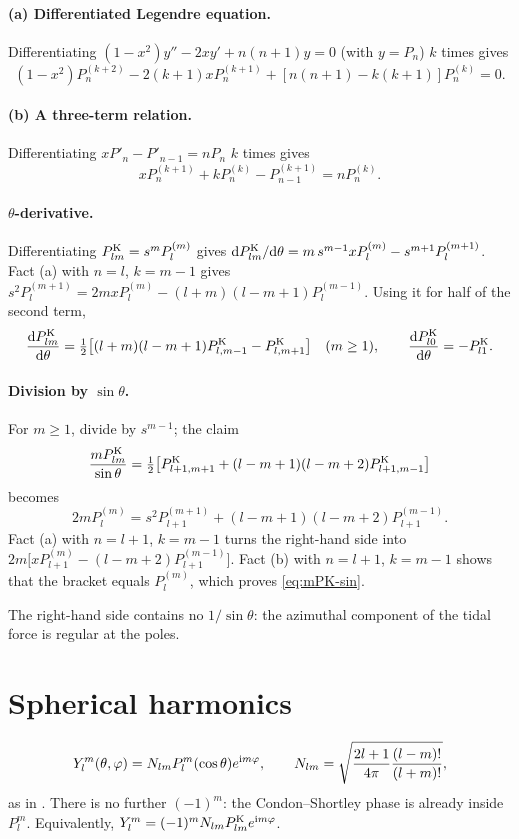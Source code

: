 \paragraph{(a) Differentiated Legendre equation.} Differentiating $(1-x^2)y''-2xy'+n(n+1)y=0$ (with $y=P_n$) $k$ times gives
\[
  (1-x^2)P^{(k+2)}_n-2(k+1)xP^{(k+1)}_n+[n(n+1)-k(k+1)]P^{(k)}_n=0.
\]

\paragraph{(b) A three-term relation.} Differentiating $xP'_n-P'_{n-1}=nP_n$ $k$ times gives
\[
  xP^{(k+1)}_n+kP^{(k)}_n-P^{(k+1)}_{n-1}=nP^{(k)}_n.
\]

\paragraph{$\theta$-derivative.} Differentiating $P^{\mathrm K}_{lm}=s^mP^{(m)}_l$ gives $\mathrm{d}P^{\mathrm K}_{lm}/\mathrm{d}\theta=m\,s^{m-1}xP^{(m)}_l-s^{m+1}P^{(m+1)}_l$. Fact (a) with $n=l$, $k=m-1$ gives $s^2P^{(m+1)}_l=2mxP^{(m)}_l-(l+m)(l-m+1)P^{(m-1)}_l$. Using it for half of the second term,
\begin{equation}
  \frac{\mathrm{d}P^{\mathrm K}_{lm}}{\mathrm{d}\theta}=\tfrac12\big[(l+m)(l-m+1)P^{\mathrm K}_{l,m-1}-P^{\mathrm K}_{l,m+1}\big]\quad(m\ge1),\qquad \frac{\mathrm{d}P^{\mathrm K}_{l0}}{\mathrm{d}\theta}=-P^{\mathrm K}_{l1}. \label{eq:dPK}
\end{equation}

\paragraph{Division by $\sin\theta$.} For $m\ge1$, divide by $s^{m-1}$; the claim
\begin{equation}
  \frac{mP^{\mathrm K}_{lm}}{\sin\theta}=\tfrac12\big[P^{\mathrm K}_{l+1,m+1}+(l-m+1)(l-m+2)P^{\mathrm K}_{l+1,m-1}\big] \label{eq:mPK-sin}
\end{equation}
becomes
\[
  2mP^{(m)}_l=s^2P^{(m+1)}_{l+1}+(l-m+1)(l-m+2)P^{(m-1)}_{l+1}.
\]
Fact (a) with $n=l+1$, $k=m-1$ turns the right-hand side into $2m\big[xP^{(m)}_{l+1}-(l-m+2)P^{(m-1)}_{l+1}\big]$. Fact (b) with $n=l+1$, $k=m-1$ shows that the bracket equals $P^{(m)}_l$, which proves \eqref{eq:mPK-sin}.

The right-hand side contains no $1/\sin\theta$: the azimuthal component of the tidal force is regular at the poles.

\section{Spherical harmonics}
\begin{equation}
  Y_l^m(\theta,\varphi)=N_{lm}P_l^m(\cos\theta)e^{\mathrm{i} m\varphi},\qquad N_{lm}=\sqrt{\frac{2l+1}{4\pi}\frac{(l-m)!}{(l+m)!}}, \label{eq:Ylm-def}
\end{equation}
as in \citet[eq.~5.2(1)]{Varshalovich1988}. There is no further $(-1)^m$: the Condon--Shortley phase is already inside $P_l^m$. Equivalently, $Y_l^m=(-1)^mN_{lm}P^{\mathrm K}_{lm}e^{\mathrm{i} m\varphi}$.

